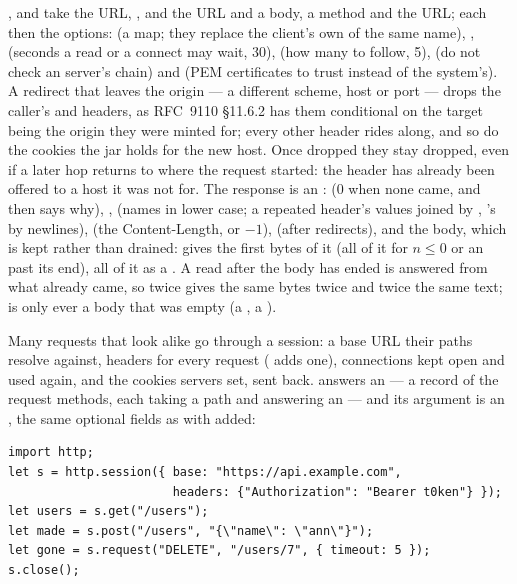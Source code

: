 \noindent {},  and  take the URL, ,
 and  the URL and a body,  a method and
the URL; each then the options:  (a map; they replace the
client's own of the same name), ,  (seconds a read
or a connect may wait, 30),  (how many to follow, 5),
 (do not check an  server's chain) and
 (PEM certificates to trust instead of the system's).
A redirect that leaves the origin --- a different scheme, host or port ---
drops the caller's  and  headers, as
RFC~9110 \S11.6.2 has them conditional on the target being the origin
they were minted for; every other header rides along, and so do the
cookies the jar holds for the new host. Once dropped they stay dropped,
even if a later hop returns to where the request started: the header has
already been offered to a host it was not for. The response is an
:  (0 when none came, and then 
says why), ,  (names in lower case; a repeated
header's values joined by , 's by newlines),
 (the Content-Length, or $-1$),  (after redirects), and
the body, which is kept rather than drained:  gives the
first  bytes of it (all of it for $n \leq 0$ or an  past
its end),  all of it as a . A read after the body
has ended is answered from what already came, so  twice
gives the same bytes twice and  twice the same text;
\ic{[]} is only ever a body that was empty (a , a ).

Many requests that look alike go through a session: a base URL their
paths resolve against, headers for every request ( adds one), connections kept open and used again, and the cookies
servers set, sent back.  answers an  --- a
record of the request methods, each taking a path and answering an
 --- and its argument is an , the same
optional fields as  with  added:

\begin{lstlisting}
import http;
let s = http.session({ base: "https://api.example.com",
                       headers: {"Authorization": "Bearer t0ken"} });
let users = s.get("/users");
let made = s.post("/users", "{\"name\": \"ann\"}");
let gone = s.request("DELETE", "/users/7", { timeout: 5 });
s.close();
\end{lstlisting}


